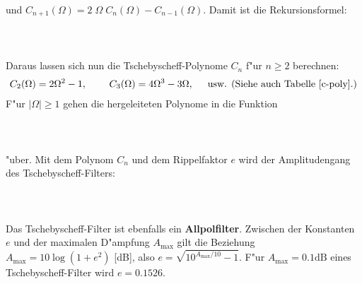 und $C_{n+1}(\Omega)=2\;\Omega\; C_{n}(\Omega)-C_{n-1}(\Omega)$. Damit ist die Rekursionsformel:\\~\\
\\~\\
Daraus lassen sich nun die Tschebyscheff-Polynome $C_{n}$ f"ur $n\geq 2$
berechnen:
\begin{eqnarray*} 
C_{2}(\Omega)=2\Omega^{2}-1, & \hspace*{0.5cm}& C_{3}(\Omega)=4\Omega^{3}-3\Omega, \hspace{0.5cm}\mbox{usw. (Siehe auch Tabelle~\ref{c-poly}.)}  
\end{eqnarray*}
F"ur $|\Omega|\geq1$ gehen die hergeleiteten Polynome in die Funktion\\~\\
\\~\\ \nit "uber.  Mit dem Polynom $C_{n}$ und dem Rippelfaktor $e$ wird der
Amplitudengang des Tschebyscheff-Filters:\\~\\
\\~\\
\nit Das Tschebyscheff-Filter ist ebenfalls ein {\bf Allpolfilter}.
Zwischen der Konstanten $e$ und der maximalen D"ampfung $A_{\max}$ gilt
die Beziehung $A_{\max}=10\log{(1+e^{2})}$ [dB], also $e=\sqrt{10^{A_{\max}/10}-1}$.
F"ur $A_{\max}=0.1\mbox{dB}$ eines Tschebyscheff-Filter wird $e=0.1526$.
